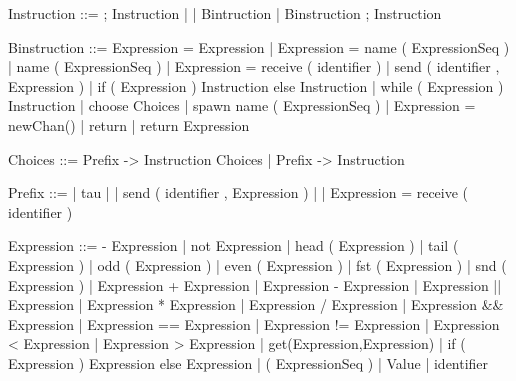 \documentclass[11pt]{report}
\begin{document}
\begin{verbnobox}[\normalfont]
Instruction ::= ; Instruction
               |
               | Bintruction 
               | Binstruction ; Instruction
\end{verbnobox}
\vspace*{3pt}

\begin{verbnobox}[\normalfont]
Binstruction ::= Expression = Expression 
                 | Expression = name ( ExpressionSeq )
                 | name ( ExpressionSeq )
                 | Expression = receive ( identifier )
                 | send ( identifier , Expression )
                 | if ( Expression ) { Instruction } else { Instruction }
                 | while ( Expression ) { Instruction }
                 | choose { Choices }
                 | spawn name ( ExpressionSeq )
                 | Expression = newChan()
                 | return
                 | return Expression
\end{verbnobox}
\vspace*{3pt}

\begin{verbnobox}[\normalfont]
Choices ::= Prefix -> { Instruction } Choices | Prefix -> { Instruction }
\end{verbnobox}
\vspace*{3pt}

\begin{verbnobox}[\normalfont]
Prefix ::= | tau
         | | send ( identifier , Expression )
         | | Expression = receive ( identifier )
\end{verbnobox}
\vspace*{3pt}

\begin{verbnobox}[\normalfont]
Expression ::= - Expression
               | not Expression
               | head ( Expression )
               | tail ( Expression )
               | odd ( Expression )
               | even ( Expression )
               | fst ( Expression )
               | snd ( Expression )
               | Expression + Expression
               | Expression - Expression
               | Expression || Expression
               | Expression * Expression
               | Expression / Expression
               | Expression && Expression
               | Expression == Expression
               | Expression != Expression 
               | Expression < Expression
               | Expression > Expression
               | get(Expression,Expression)
               | if ( Expression ) { Expression } else { Expression }
               | ( ExpressionSeq )
               | Value
               | identifier
\end{verbnobox}
\vspace*{3pt}
\end{document}
